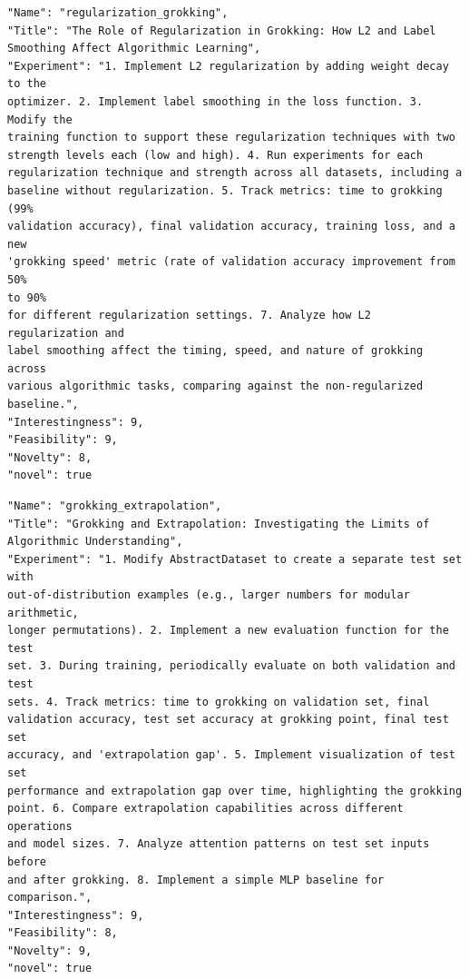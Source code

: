 \documentclass[11pt, a4paper]{include/gdm_format}
\begin{document}
\begin{tcolorbox}[breakable,colback=blue!5!white, colframe=blue!75!black, title=Idea 11/50 - \texttt{regularization\_grokking}]
\small
\begin{verbatim}
"Name": "regularization_grokking",
"Title": "The Role of Regularization in Grokking: How L2 and Label
Smoothing Affect Algorithmic Learning",
"Experiment": "1. Implement L2 regularization by adding weight decay to the
optimizer. 2. Implement label smoothing in the loss function. 3. Modify the
training function to support these regularization techniques with two
strength levels each (low and high). 4. Run experiments for each
regularization technique and strength across all datasets, including a
baseline without regularization. 5. Track metrics: time to grokking (99%
validation accuracy), final validation accuracy, training loss, and a new
'grokking speed' metric (rate of validation accuracy improvement from 50%
to 90%
for different regularization settings. 7. Analyze how L2 regularization and
label smoothing affect the timing, speed, and nature of grokking across
various algorithmic tasks, comparing against the non-regularized
baseline.",
"Interestingness": 9,
"Feasibility": 9,
"Novelty": 8,
"novel": true
\end{verbatim}
\end{tcolorbox}

\begin{tcolorbox}[breakable,colback=blue!5!white, colframe=blue!75!black, title=Idea 12/50 - \texttt{grokking\_extrapolation}]
\small
\begin{verbatim}
"Name": "grokking_extrapolation",
"Title": "Grokking and Extrapolation: Investigating the Limits of
Algorithmic Understanding",
"Experiment": "1. Modify AbstractDataset to create a separate test set with
out-of-distribution examples (e.g., larger numbers for modular arithmetic,
longer permutations). 2. Implement a new evaluation function for the test
set. 3. During training, periodically evaluate on both validation and test
sets. 4. Track metrics: time to grokking on validation set, final
validation accuracy, test set accuracy at grokking point, final test set
accuracy, and 'extrapolation gap'. 5. Implement visualization of test set
performance and extrapolation gap over time, highlighting the grokking
point. 6. Compare extrapolation capabilities across different operations
and model sizes. 7. Analyze attention patterns on test set inputs before
and after grokking. 8. Implement a simple MLP baseline for comparison.",
"Interestingness": 9,
"Feasibility": 8,
"Novelty": 9,
"novel": true
\end{verbatim}
\end{tcolorbox}
\end{document}
